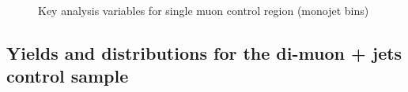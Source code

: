 \begin{figure}[!h]
\begin{center}
         \\
        \caption{Key analysis variables for single muon control region (monojet bins)}
        \label{fig:distribution_singlemu_mono}
    \end{center}
\end{figure}

\newpage
\subsection{Yields and distributions for the di-muon + jets control sample}

